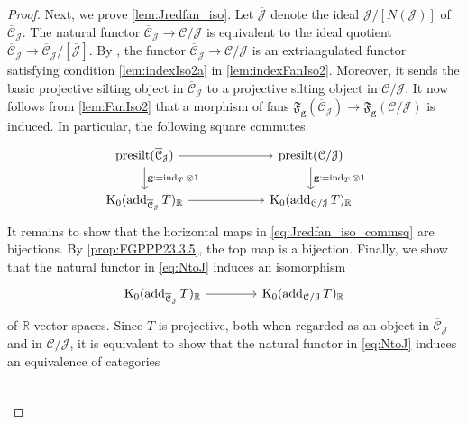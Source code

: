 \documentclass[10pt,twoside, a4paper,reqno]{amsart}
\DeclareMathOperator{\presilt}{presilt}
\DeclareMathOperator{\add}{add}
\DeclareMathOperator{\ind}{ind}
\newcommand{\partfan}[1]{\mathfrak{F}_{\bfg}(#1)}
\newcommand{\R}{\mathbb{R}}
\newcommand{\calC}{\mathcal{C}}
\newcommand{\K}{\mathrm{K}}
\newcommand{\bfg}{\mathbf{g}}
\theoremstyle{definition}
\begin{document}
\begin{proof}
Next, we prove \eqref{lem:Jredfan_iso}. Let $\overline{\mathcal{J}}$ denote the ideal $\mathcal{J}/[N(\mathcal{J})]$ of $\overline{\calC}_{\mathcal{J}}$. The natural functor $\overline{\calC}_{\mathcal{J}} \xrightarrow{} \calC/\mathcal{J}$ is equivalent to the ideal quotient $\overline{\calC}_{\mathcal{J}} \xrightarrow{} \overline{\calC}_{\mathcal{J}}/[\overline{\mathcal{J}}]$. By , the functor $\overline{\calC}_{\mathcal{J}} \xrightarrow{} \calC/\mathcal{J}$ is an extriangulated functor satisfying condition {\eqref{lem:indexIso2a} in \cref{lem:indexFanIso2}}. Moreover, it sends the basic projective silting object in $\overline{\calC}_{\mathcal{J}}$ to a projective silting object in $\calC/\mathcal{J}$. It now follows from \eqref{lem:FanIso2} that a morphism of fans $\partfan{\overline{\calC}_{\mathcal{J}}} \xrightarrow{} \partfan{\calC/\mathcal{J}}$ is induced.
    In particular, the following square commutes.
    \begin{equation}\label{eq:Jredfan_iso_commsq}
    \begin{tikzcd}[column sep=6em]
        \presilt(\overline{\calC}_{\mathcal{J}}) \arrow[d,"\bfg\coloneqq\ind_T\otimes 1"] \arrow[r] & \presilt({\calC}/{\mathcal{J}}) \arrow[d,"\bfg\coloneqq\ind_T\otimes 1"] \\
        \K_0(\add_{\overline{\calC}_{\mathcal{J}}}T)_{\R} \arrow[r] & \K_0(\add_{{\calC}/{\mathcal{J}}}T)_{\R}
    \end{tikzcd}
    \end{equation}
    It remains to show that the horizontal maps in \eqref{eq:Jredfan_iso_commsq} are bijections.
    By \eqref{prop:FGPPP23.3.5}, the top map is a bijection. 
    Finally, we show that the natural functor in \eqref{eq:NtoJ} induces an isomorphism 
    \begin{equation*}
    \begin{tikzcd}[column sep=4em]
        \K_0(\add_{\overline{\calC}_{\mathcal{J}}}T)_{\R} \arrow[r] & \K_0(\add_{{\calC}/{\mathcal{J}}}T)_{\R}
    \end{tikzcd}
    \end{equation*}
    of $\R$-vector spaces. Since $T$ is projective, both when regarded as an object in $\overline{\calC}_{\mathcal{J}}$ and in ${\calC}/{\mathcal{J}}$, it is equivalent to show that the natural functor in \eqref{eq:NtoJ} induces an equivalence of categories
    \begin{equation*}
        \begin{tikzcd}[column sep=4em]

\end{tikzcd}
\end{equation*}
\end{proof}
\end{document}
